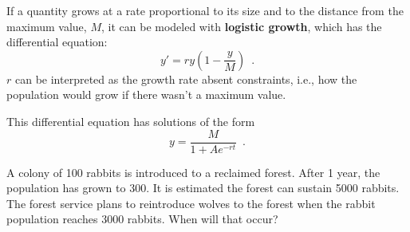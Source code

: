 \begin{definition}
If a quantity grows at a rate proportional to its size and to the distance from the maximum value, $M$, it can be modeled with {\bf logistic growth}, which has the differential equation:
$$y' = ry\left(1-\frac{y}{M}\right) \enspace .$$
$r$ can be interpreted as the growth rate absent constraints, i.e., how the population would grow if there wasn't a maximum value.

This differential equation has solutions of the form
$$y = \frac{M}{1+Ae^{-rt}} \enspace .$$
\end{definition}
\begin{example}
A colony of 100 rabbits is introduced to a reclaimed forest. After 1 year, the population has grown to 300. It is estimated the forest can sustain 5000 rabbits. The forest service plans to reintroduce wolves to the forest when the rabbit population reaches 3000 rabbits. When will that occur?


\end{example}
